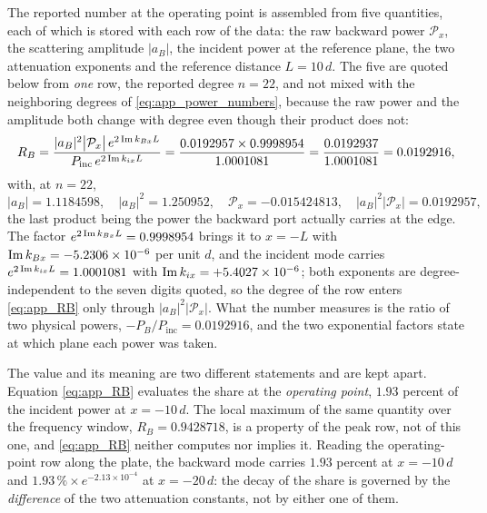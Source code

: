 The reported number at the operating point is assembled from five quantities,
each of which is stored with each row of the data: the raw backward power
$\mathcal{P}_x$, the scattering amplitude $|a_B|$, the incident power at the
reference plane, the two attenuation exponents and the reference distance
$L=10\,d$.  The five are quoted below from \emph{one} row, the reported degree
$n=22$, and not mixed with the neighboring degrees of
\eqref{eq:app_power_numbers}, because the raw power and the amplitude both change
with degree even though their product does not:
\begin{equation}
\label{eq:app_RB}
R_B=\frac{|a_B|^{2}\bigl|\mathcal{P}_x\bigr|\,e^{2\operatorname{Im} k_{Bx}L}}
{P_{\text{inc}}\,e^{2\operatorname{Im} k_{ix}L}}
=\frac{0.0192957\times0.9998954}{1.0001081}
=\frac{0.0192937}{1.0001081}=0.0192916 ,
\end{equation}
with, at $n=22$,
\begin{equation}
\label{eq:app_RB_inputs}
|a_B|=1.1184598,\quad
|a_B|^{2}=1.250952,\quad
\mathcal{P}_x=-0.015424813,\quad
|a_B|^{2}\bigl|\mathcal{P}_x\bigr|=0.0192957 ,
\end{equation}
the last product being the power the backward port actually carries at the edge.
The factor $e^{2\operatorname{Im} k_{Bx}L}=0.9998954$ brings it to $x=-L$ with
$\operatorname{Im} k_{Bx}=-5.2306\times10^{-6}$ per unit $d$, and the incident mode carries
$e^{2\operatorname{Im} k_{ix}L}=1.0001081$ with $\operatorname{Im} k_{ix}=+5.4027\times10^{-6}$; both
exponents are degree-independent to the seven digits quoted, so the degree of the
row enters \eqref{eq:app_RB} only through $|a_B|^{2}|\mathcal{P}_x|$.  What the
number measures is the ratio of two physical powers,
$-P_B/P_{\text{inc}}=0.0192916$, and the two exponential factors state at which
plane each power was taken.

The value and its meaning are two different statements and are kept apart.
Equation \eqref{eq:app_RB} evaluates the share at the \emph{operating point},
$1.93$ percent of the incident power at $x=-10\,d$.  The local maximum of the
same quantity over the frequency window, $R_B=0.9428718$, is a property of the
peak row, not of this one, and \eqref{eq:app_RB} neither computes nor implies it.  Reading the operating-point row along the plate, the backward mode carries
$1.93$ percent at $x=-10\,d$ and $1.93\,\%\times e^{-2.13\times10^{-4}}$ at
$x=-20\,d$: the decay of the share is governed by the \emph{difference} of the two
attenuation constants, not by either one of them.
